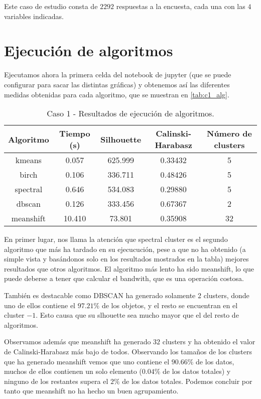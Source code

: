 Este caso de estudio consta de $2292$ respuestas a la encuesta, cada una con las $4$ variables indicadas.

\section{Ejecución de algoritmos}

Ejecutamos ahora la primera celda del notebook de jupyter (que se puede configurar para sacar las distintas gráficas) y obtenemos así las diferentes medidas obtenidas para cada algoritmo, que se muestran en \eqref{tab:c1_alg}.

\begin{table}[H]
\centering
\caption{Caso 1 - Resultados de ejecución de algoritmos.}
\label{tab:c1_alg}
\begin{tabular}{ccccc}
\toprule
 Algoritmo & Tiempo (s) & Silhouette & Calinski-Harabasz & Número de clusters \\
\midrule
kmeans & 0.057 & 625.999 & 0.33432 & 5 \\
birch & 0.106 & 336.711 & 0.48426 & 5 \\
spectral & 0.646 & 534.083 & 0.29880 & 5 \\
dbscan & 0.126 & 333.456 & 0.67367 & 2 \\
meanshift & 10.410 & 73.801 & 0.35908 & 32 \\
\bottomrule
\end{tabular}
\end{table}

En primer lugar, nos llama la atención que spectral cluster es el segundo algoritmo que más ha tardado en su ejecucución, pese a que no ha obtenido (a simple vista y basándonos solo en los resultados mostrados en la tabla) mejores resultados que otros algoritmos. El algoritmo más lento ha sido meanshift, lo que puede deberse a tener que calcular el bandwith, que es una operación costosa.

También es destacable como DBSCAN ha generado solamente 2 clusters, donde uno de ellos contiene el $97.21\%$ de los objetos, y el resto se encuentran en el cluster $-1$. Esto causa que su slhouette sea mucho mayor que el del resto de algoritmos.

Observamos además que meanshift ha generado $32$ clusters y ha obtenido el valor de Calinski-Harabasz más bajo de todos. Observando los tamaños de los clusters que ha generado meanshift vemos que uno contiene el $90.66\%$ de los datos, muchos de ellos contienen un solo elemento ($0.04\%$ de los datos totales) y ninguno de los restantes supera el $2\%$ de los datos totales. Podemos concluir por tanto que meanshift no ha hecho un buen agrupamiento.

